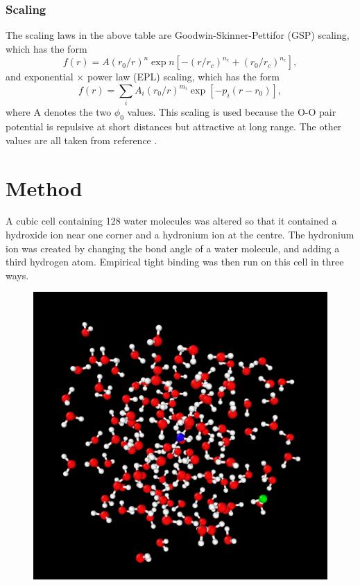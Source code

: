 \documentclass[reprint,]{revtex4-2}
\begin{document}
\subsubsection{Scaling}
\label{sec:scaling}
The scaling laws in the above table are Goodwin-Skinner-Pettifor (GSP) scaling,\cite{Goodwin1989} which has the form
\begin{equation}
	f(r)=A(r_{0}/r)^{n}\exp{n[-(r/r_{c})^{n_{c}}+(r_{0}/r_{c})^{n_{c}}]},
\end{equation}
and exponential $\times$ power law (EPL) scaling,\cite{Lozovoi2014} which has the form
\begin{equation}
	f(r)=\sum_i A_{i}(r_{0}/r)^{m_{i}}\exp[-p_{i}(r-r_{0})],
\end{equation}
where A denotes the two $\phi_{0}$ values. This scaling is used because the O-O pair potential is repulsive at short distances but attractive at long range. The other values are all taken from reference \cite{Lozovoi2014}.

\section{Method}
\label{sec:method}

A cubic cell containing 128 water molecules was altered so that it contained a hydroxide ion near one corner and a hydronium ion at the centre. The hydronium ion was created by changing the bond angle of a water molecule, and adding a third hydrogen atom. Empirical tight binding was then run on this cell in three ways.
\begin{figure}
	\centering
	\includegraphics[width=0.8\linewidth]{figures/128}
	\label{fig:128}	
\end{figure}
\end{document}
